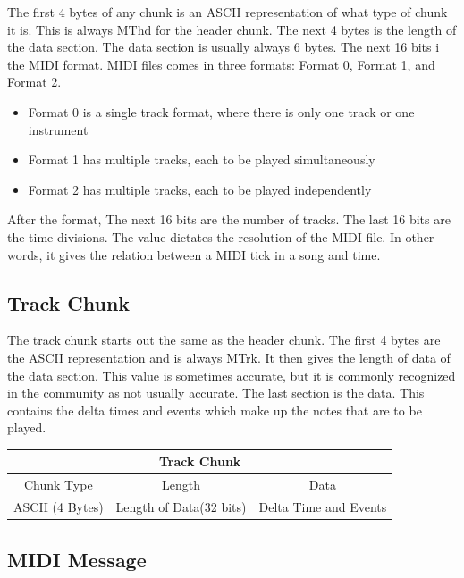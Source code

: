 \documentclass[11pt, a4paper]{report}
\begin{document}
The first 4 bytes of any chunk is an ASCII representation of what type of chunk it is. This is always MThd for the header chunk. The next 4 bytes is the length of the data section. The data section is usually always 6 bytes. The next 16 bits i the MIDI format. MIDI files comes in three formats: Format 0, Format 1, and Format 2. \\

\begin{itemize}
  \item Format 0 is a single track format, where there is only one track or one instrument
  \item Format 1 has multiple tracks, each to be played simultaneously
  \item Format 2 has multiple tracks, each to be played independently
\end{itemize}

 After the format, The next 16 bits are the number of tracks. The last 16 bits are the time divisions. The value dictates the resolution of the MIDI file. In other words, it gives the relation between a MIDI tick in a song and time. 

\subsection{Track Chunk}

The track chunk starts out the same as the header chunk. The first 4 bytes are the ASCII representation and is always MTrk. It then gives the length of data of the data section. This value is sometimes accurate, but it is commonly recognized in the community as not usually accurate. The last section is the data. This contains the delta times and events which make up the notes that are to be played. 

\label{fig:track}
\begin{center}
 \begin{tabular}{||c | c | c||} 
 \hline
  \multicolumn{3}{|c|}{Track Chunk} \\ 
 \hline
  Chunk Type & Length & Data \\
 \hline
  ASCII (4 Bytes) & Length of Data(32 bits)  &  Delta Time and Events \\
 
 \hline
\end{tabular}
\end{center}


\subsection{MIDI Message}
\end{document}
